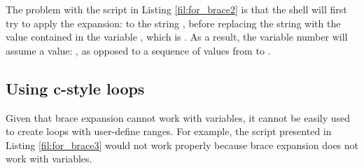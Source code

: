 The problem with the script in Listing \ref{fil:for_brace2} is that the shell will first try to apply the expansion:  to the string , before replacing the string  with the value contained in the variable , which is . As a result, the variable number will assume a value: , as opposed to a sequence of values from  to .

\subsection{Using c-style  loops}

Given that brace expansion cannot work with variables, it cannot be easily used to create loops with user-define ranges. For example, the script presented in Listing \ref{fil:for_brace3} would not work properly because brace expansion does not work with variables.

